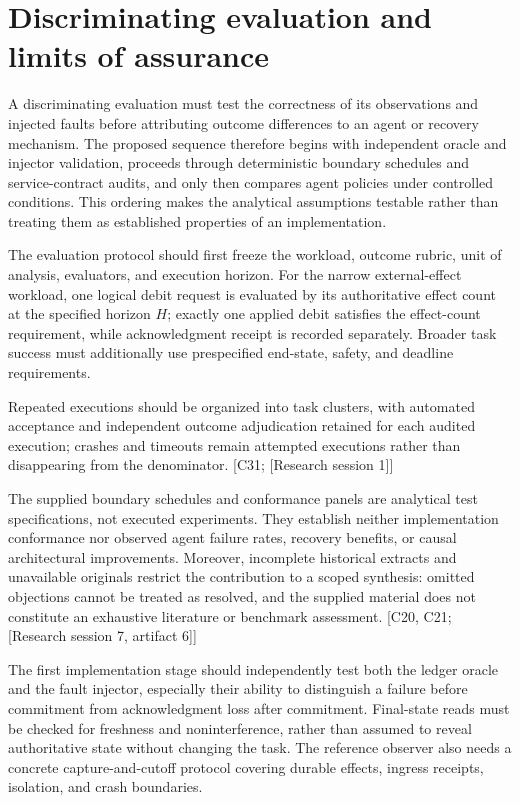 \documentclass[11pt]{article}
\begin{document}
\section{Discriminating evaluation and limits of assurance}
A discriminating evaluation must test the correctness of its observations and injected faults before attributing outcome differences to an agent or recovery mechanism. The proposed sequence therefore begins with independent oracle and injector validation, proceeds through deterministic boundary schedules and service-contract audits, and only then compares agent policies under controlled conditions. This ordering makes the analytical assumptions testable rather than treating them as established properties of an implementation.

The evaluation protocol should first freeze the workload, outcome rubric, unit of analysis, evaluators, and execution horizon. For the narrow external-effect workload, one logical debit request is evaluated by its authoritative effect count at the specified horizon $H$; exactly one applied debit satisfies the effect-count requirement, while acknowledgment receipt is recorded separately. Broader task success must additionally use prespecified end-state, safety, and deadline requirements.

Repeated executions should be organized into task clusters, with automated acceptance and independent outcome adjudication retained for each audited execution; crashes and timeouts remain attempted executions rather than disappearing from the denominator. [C31; [Research session 1]]

The supplied boundary schedules and conformance panels are analytical test specifications, not executed experiments. They establish neither implementation conformance nor observed agent failure rates, recovery benefits, or causal architectural improvements. Moreover, incomplete historical extracts and unavailable originals restrict the contribution to a scoped synthesis: omitted objections cannot be treated as resolved, and the supplied material does not constitute an exhaustive literature or benchmark assessment. [C20, C21; [Research session 7, artifact 6]]

The first implementation stage should independently test both the ledger oracle and the fault injector, especially their ability to distinguish a failure before commitment from acknowledgment loss after commitment. Final-state reads must be checked for freshness and noninterference, rather than assumed to reveal authoritative state without changing the task. The reference observer also needs a concrete capture-and-cutoff protocol covering durable effects, ingress receipts, isolation, and crash boundaries.
\end{document}
